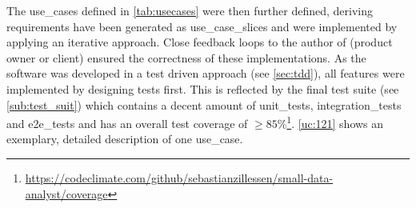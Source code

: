 The \glspl{use_case} defined in \autoref{tab:usecases} were then further defined, deriving requirements have been generated as \glspl{use_case_slice} and were implemented by applying an iterative approach. Close feedback loops to the author of \cite{sassoon2016,sassoon2014,sassoon2016CD} (\gls{product owner} or client) ensured the correctness of these implementations. As the software was developed in a test driven approach (see \autoref{sec:tdd}), all features were implemented by designing tests first. This is reflected by the final test suite (see \autoref{sub:test_suit}) which contains a decent amount of \glspl{unit_test}, \glspl{integration_test} and \glspl{e2e_test} and has an overall test coverage of $ \geq 85\%$\footnote{\url{https://codeclimate.com/github/sebastianzillessen/small-data-analyst/coverage}}. \autoref{uc:121} shows an exemplary, detailed description of one \gls{use_case}.

